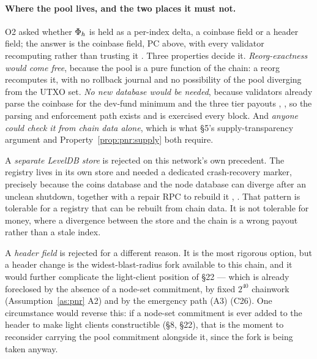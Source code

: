 \paragraph{Where the pool lives, and the two places it must not.} O2 asked whether $\Phi_{h}$ is
held as a per-index delta, a coinbase field or a header field; the answer is the coinbase field, PC
above, with every validator recomputing rather than trusting it . Three
properties decide it. \emph{Reorg-exactness would come free}, because the pool is a pure function of
the chain: a reorg recomputes it, with no rollback journal and no possibility of the pool diverging
from the UTXO set. \emph{No new database would be needed}, because validators already parse the
coinbase for the dev-fund minimum and the three tier payouts \shipped
{}, , so the
parsing and enforcement path exists and is exercised every block. And \emph{anyone could check it
from chain data alone}, which is what \S5's supply-transparency argument and
Property~\ref{prop:pnr:supply} both require.

A \emph{separate LevelDB store} is rejected on this network's own precedent. The \FluxNode registry
lives in its own store and needed a dedicated crash-recovery marker, precisely because the coins
database and the node database can diverge after an unclean shutdown, together with a repair RPC to
rebuild it \shipped {},
. That pattern is tolerable for a registry that can be
rebuilt from chain data. It is not tolerable for money, where a divergence between the store and the
chain is a wrong payout rather than a stale index.

A \emph{header field} is rejected for a different reason. It is the most rigorous option, but a
header change is the widest-blast-radius fork available to this chain, and it would further
complicate the light-client position of \S22 --- which is already foreclosed by the absence of a
node-set commitment, by fixed $2^{40}$ chainwork (Assumption~\ref{as:pnr} A2) and by the emergency
path (A3) (C26). One circumstance would reverse this: if a node-set commitment is ever added to the
header to make light clients constructible (\S8, \S22), that is the moment to reconsider carrying
the pool commitment alongside it, since the fork is being taken anyway.

